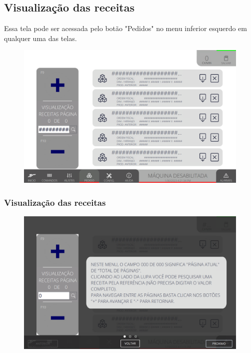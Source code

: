 \thispagestyle{fancy}
\vspace*{40 pt}
\subsection{Visualização das receitas} \label{sec:telaVisualizacaoReceitas}
Essa tela pode ser acessada pelo botão "Pedidos" no menu inferior esquerdo em qualquer uma das telas.
\vspace*{\fill}
\begin{figure}[h]
    \centering
    \includegraphics[width=480 px,height=300 px]{src/imagesICV/09-request/visualization/Tela-Principal.png}
\end{figure}
\vspace*{\fill}


\newpage
\thispagestyle{fancy}
\vspace*{40 pt}
\subsubsection{\small{Visualização das receitas}} \label{sec:telaVisualizacaoReceitasVisualizacaoReceitas}
\vspace*{\fill}
\begin{figure}[h]
    \centering
    \includegraphics[width=576 px,height=360 px]{src/imagesICV/09-request/visualization/e-1.png}
\end{figure}
\vspace*{\fill}

